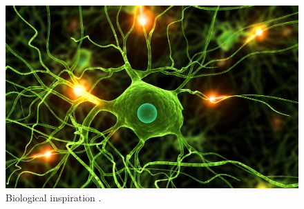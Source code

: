 \begin{figure}[!htb]
\centering
\includegraphics[width=.50\columnwidth]{images/049neuron1}
\caption[Biological inspiration]{Biological inspiration \cite{RefWorks:158}.}
\label{fig:049neuron1}
\end{figure}